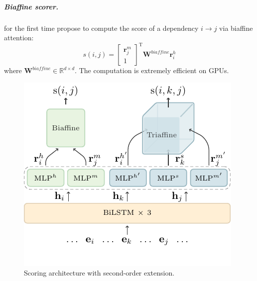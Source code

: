 \subparagraph{Biaffine scorer.}
\citet{Timothy-d17-biaffine} for the first time propose to compute the score of a dependency $i \rightarrow j$ via biaffine attention:
\begin{equation} \label{equation:biaffine}
    s(i,j) =  \left[
        \begin{array}{c}
            \mathbf{r}_{j}^{m} \\
            1
        \end{array}
        \right]^\mathrm{T}
    \mathbf{W}^\textit{biaffine}  \mathbf{r}_{i}^{h}
\end{equation}
where $\mathbf{W}^\textit{biaffine} \in \mathbb{R}^{d \times d}$.
The computation is %
extremely efficient on GPUs.


\begin{figure}[tb]
    \centering
    \includegraphics{figures/framework.pdf}
    \caption{Scoring architecture with second-order extension.
    }
    \label{fig:framework}
\end{figure}

